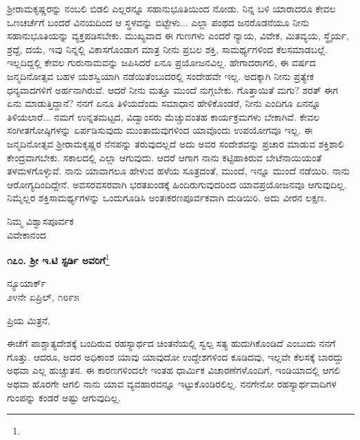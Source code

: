 ಶ‍್ರೀರಾಮಕೃಷ್ಣರನ್ನು ನಂಬಲಿ ಬಿಡಲಿ ಎಲ್ಲರನ್ನೂ ಸಹಾನುಭೂತಿಯಿಂದ ನೋಡು. ನಿನ್ನ ಬಳಿ ಯಾರಾದರೂ ಕೇವಲ ಒಣಚರ್ಚೆಗೆ ಬಂದರೆ ವಿನಯದಿಂದ ಆ ಸ್ಥಳವನ್ನು ಬಿಟ್ಟೇಳು... ಎಲ್ಲಾ ಪಂಥದ ಜನರೊಡನೆಯೂ ನೀನು ಸಹಾನುಭೂತಿಯನ್ನು ವ್ಯಕ್ತಪಡಿಸಬೇಕು. ಮುಖ್ಯವಾದ ಈ ಗುಣಗಳು ಎಂದರೆ ನ್ಯಾಯ, ವಿವೇಕ, ಮಿತವ್ಯಯ, ಸ್ಥೈರ್ಯ, ಶ್ರದ್ದೆ, ದಯೆ, ಇವು ನಿನ್ನಲ್ಲಿ ವಿಕಾಸಗೊಂಡಾಗ ಮಾತ್ರ ನೀನು ಪ್ರಬಲ ಶಕ್ತಿ, ಸಾಮರ್ಥ್ಯಗಳಿಂದ ಕೆಲಸಮಾಡಬಲ್ಲೆ. ಇಲ್ಲದಿದ್ದಲ್ಲಿ ಕೇವಲ ಗುರುನಾಮವನ್ನು ಜಪಿಸಿದರೆ ಏನೂ ಪ್ರಯೋಜನವಿಲ್ಲ. ಹೇಗಾದರಾಗಲಿ, ಈ ವರ್ಷದ ಜನ್ಮದಿನೋತ್ಸವ ಬಹಳ ಯಶಸ್ವಿಯಾಗಿ ನಡೆಯಿತೆಂಬುದರಲ್ಲಿ ಸಂದೇಹವೇ ಇಲ್ಲ. ಅದಕ್ಕಾಗಿ ನೀನು ಪ್ರತ್ಯೇಕ ಧನ್ಯವಾದಗಳಿಗೆ ಅರ್ಹನಾಗಿರುವೆ. ಆದರೆ ನೀನು ಮತ್ತೂ ಮುಂದೆ ನುಗ್ಗಬೇಕು. ಗೊತ್ತಾಯಿತೆ ಮಗು? ಶರತ್ ಈಗ ಏನು ಮಾಡುತ್ತಿದ್ದಾನೆ? ನನಗೆ ಏನೂ ತಿಳಿಯದೆಂದು ಸಮಾಧಾನ ಹೇಳಿಕೊಂಡರೆ, ನೀನು ಎಂದಿಗೂ ಏನನ್ನೂ ತಿಳಿಯಲಾರೆ... ನಮಗೆ ಉನ್ನತಮಟ್ಟದ, ವಿದ್ವಾಂಸರು ಮೆಚ್ಚುವಂತಹ ಕಾರ್ಯಕ್ರಮಗಳು ಬೇಕಾಗಿವೆ. ಕೇವಲ ಸಂಗೀತಗೋಷ್ಠಿಗಳನ್ನು ಏರ್ಪಡಿಸುವುದು ಮುಂತಾದುವುಗಳಿಂದ ಯಾವೊಂದು ಉಪಯೋಗವೂ ಇಲ್ಲ. ಈ ಜನ್ಮದಿನೋತ್ಸವ ಶ‍್ರೀರಾಮಕೃಷ್ಣರ ನೆನಪನ್ನು ತರುವುದಲ್ಲದೆ ಅದು ಅವರ ಸಂದೇಶವನ್ನು ಪ್ರಚಾರ ಮಾಡುವ ಶಕ್ತಿಶಾಲಿ ಕೇಂದ್ರವಾಗಬೇಕು. ಸಕಾಲದಲ್ಲಿ ಎಲ್ಲಾ ಆಗುವುದು. ಆದರೆ ಆಗಾಗ ನಾನು ಕಟ್ಟಿಹಾಕಿರುವ ಬೇಟೆನಾಯಿಯಂತೆ ತಳಮಳಗೊಳ್ಳುವೆ. ನಾನು ಯಾವಾಗಲೂ ಹೇಳುವ ಹಳೆಯ ಸೂತ್ರದಂತೆ, ಮುಂದೆ, ಇನ್ನೂ ಮುಂದೆ ನಡೆಯಿರಿ. ನಾನು ಆರೋಗ್ಯದಿಂದಿದ್ದೇನೆ. ಅವಸರವಸರವಾಗಿ ಭರತಖಂಡಕ್ಕೆ ಹಿಂದಿರುಗುವುದರಿಂದ ಯಾವಪ್ರಯೋಜನವೂ ಆಗುವುದಿಲ್ಲ. ನಿಮ್ಮೆಲ್ಲರ ಶಕ್ತಿಸಾಮರ್ಥ್ಯಗಳನ್ನು ಒಂದುಗೂಡಿಸಿ ಅಂತಃಕರಣಪೂರ್ವಕವಾಗಿ ದುಡಿಯಿರಿ. ಅದು ವೀರನ ಲಕ್ಷಣ.

\vspace{-0.5cm}

{\flushright
ನಿಮ್ಮ ವಿಶ್ವಾಸಪೂರ್ವಕ\\ವಿವೇಕಾನಂದ\par}

\begin{center}
\textbf{೧೭೦. ಶ‍್ರೀ ಇ.ಟಿ ಸ್ಟರ್ಡಿ ಅವರಿಗೆ}\footnote{}
\end{center}

\vspace{-0.7cm}

\begin{flushright}
ನ್ಯೂಯಾರ್ಕ್\\೨೪ನೇ ಏಪ್ರಿಲ್, ೧೮೯೫
\end{flushright}

\vspace{-0.3cm}

\noindent
ಪ್ರಿಯ ಮಿತ್ರನೆ,

ಈಚೆಗೆ ಪಾಶ್ಚಾತ್ಯದೇಶಕ್ಕೆ ಬಂದಿರುವ ರಹಸ್ಯಾರ್ಥದ ಚಿಂತನೆಯಲ್ಲಿ ಸ್ವಲ್ಪ ಸತ್ಯ ಹುದುಗಿಕೊಂಡಿದೆ ಎಂಬುದು ನನಗೆ ಗೊತ್ತು. ಆದರೂ, ಅದರ ಅಧಿಕಾಂಶ ಯಾವು ಯಾವುದೋ ಉದ್ದೇಶಗಳಿಂದ ಕೂಡಿದವು, ಇಲ್ಲವೇ ಕೆಲಸಕ್ಕೆ ಬಾರದ್ದು ಅಥವಾ ಎಲ್ಲ ಹುಚ್ಚುತನ. ಈ ಕಾರಣಗಳಿಂದಲೇ ಇಂತಹ ಧಾರ್ಮಿಕ ವಿಚಾರಣೆಗಳೊಂದಿಗೆ, ಇಂಡಿಯಾದಲ್ಲಿ ಆಗಲಿ ಅಥವಾ ಹೊರಗೇ ಆಗಲಿ ನಾನು ಯಾವ ವ್ಯವಹಾರವನ್ನೂ ಇಟ್ಟುಕೊಂಡಿರಲಿಲ್ಲ. ನನಗೇನೋ ರಹಸ್ಯಾರ್ಥವಾದಿಗಳ ಗುಂಪನ್ನು ಕಂಡರೆ ಅಷ್ಟು ಆಗುವುದಿಲ್ಲ.


